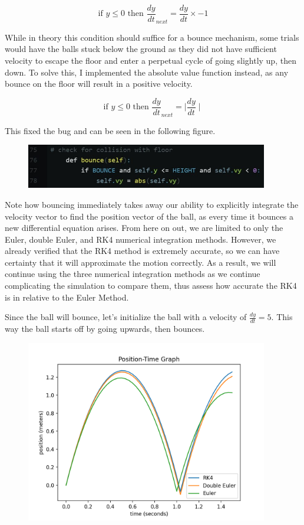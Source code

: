\documentclass[12pt]{article}
\begin{document}
$$\text{if } y \le 0 \text{ then } \frac{dy}{dt}_{next} = \frac{dy}{dt} \times -1$$

While in theory this condition should suffice for a bounce mechanism, some trials would have the balls stuck below the ground as they did not have sufficient velocity to escape the floor and enter a perpetual cycle of going slightly up, then down. To solve this, I implemented the absolute value function instead, as any bounce on the floor will result in a positive velocity.

$$\text{if } y \le 0 \text{ then } \frac{dy}{dt}_{next} = \mid \frac{dy}{dt} \mid$$

This fixed the bug and can be seen in the following figure. 

\begin{figure}[H]
\centering
\includegraphics[width=300pt]{img/bounce_code.jpg}
\caption{\label{fig:1}}
\end{figure}

Note how bouncing immediately takes away our ability to explicitly integrate the velocity vector to find the position vector of the ball, as every time it bounces a new differential equation arises. From here on out, we are limited to only the Euler, double Euler, and RK4 numerical integration methods. However, we already verified that the RK4 method is extremely accurate, so we can have certainty that it will approximate the motion correctly. As a result, we will continue using the three numerical integration methods as we continue complicating the simulation to compare them, thus assess how accurate the RK4 is in relative to the Euler Method. 

Since the ball will bounce, let's initialize the ball with a velocity of $\frac{dy}{dt} = 5$. This way the ball starts off by going upwards, then bounces.

\begin{figure}[H]
\centering
\includegraphics[width=300pt]{img/one_and_half.png}
\caption{\label{fig:1}}
\end{figure}
\end{document}
